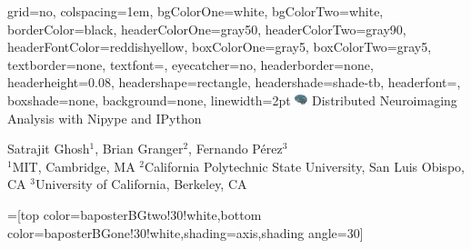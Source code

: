 \documentclass[portrait,final]{baposter}
\begin{document}
\newlength{\leftimgwidth}
\begin{poster}%
  {
  grid=no,
  colspacing=1em,
  bgColorOne=white,
  bgColorTwo=white,
  borderColor=black,
  headerColorOne=gray50,
  headerColorTwo=gray90,
  headerFontColor=reddishyellow,
  boxColorOne=gray5,
  boxColorTwo=gray5,
  textborder=none, %
  textfont=\sf, %
  eyecatcher=no,
  headerborder=none,
  headerheight=0.08\textheight,
  headershape=rectangle,
  headershade=shade-tb,
  headerfont=\Large\textsf, %
  boxshade=none, %
  background=none,
  linewidth=2pt
  }
  {\includegraphics[width=1em]{nipylogo}} %
  {\sf %
  Distributed Neuroimaging Analysis with Nipype and IPython\vspace{0.15em}}
  {\sf %
  Satrajit Ghosh$^1$, Brian Granger$^2$, Fernando P\'{e}rez$^3$\\
  \small\sf$^1$MIT, Cambridge, MA $^2$California Polytechnic State
  University, San Luis Obispo, CA $^3$University of California,
  Berkeley, CA


  }



  =[top color=baposterBGtwo!30!white,bottom color=baposterBGone!30!white,shading=axis,shading angle=30]

     \setlength{\leftimgwidth}{0.78em+8.0em}



\end{poster}
\end{document}
